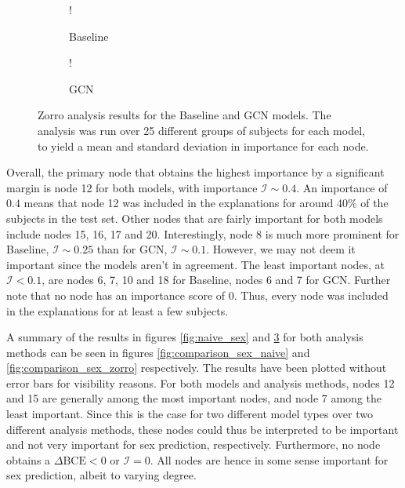 \begin{figure}[H]
    \centering
        \begin{subfigure}{.5\textwidth}
            \centering
            \begin{center}
                \resizebox {1.0\linewidth} {!} {
                    
                }
            \end{center}
            \caption{Baseline}
            \label{fig:zorro_sex_baseline}
        \end{subfigure}%
        \begin{subfigure}{.5\textwidth}
            \centering
            \begin{center}
                \resizebox {1.0\linewidth} {!} {
                    
                }
            \end{center}
            \caption{GCN}
            \label{fig:zorro_sex_gcn}
        \end{subfigure}
    \caption{Zorro analysis results for the Baseline and GCN models. The analysis was run over 25 different groups of subjects for each model, to yield a mean and standard deviation in importance for each node.}
    \label{fig:zorro_sex}
\end{figure}


Overall, the primary node that obtains the highest importance by a significant margin is node 12 for both models, with importance $\mathcal{I}\sim0.4$. An importance of $0.4$ means that node 12 was included in the explanations for around 40\% of the subjects in the test set. Other nodes that are fairly important for both models include nodes 15, 16, 17 and 20. Interestingly, node 8 is much more prominent for Baseline, $\mathcal{I}\sim0.25$ than for GCN, $\mathcal{I}\sim0.1$. However, we may not deem it important since the models aren't in agreement. The least important nodes, at $\mathcal{I}<0.1$, are nodes 6, 7, 10 and 18 for Baseline, nodes 6 and 7 for GCN. Further note that no node has an importance score of 0. Thus, every node was included in the explanations for at least a few subjects.


A summary of the results in figures \ref{fig:naive_sex} and \ref{fig:zorro_sex} for both analysis methods can be seen in figures \ref{fig:comparison_sex_naive} and \ref{fig:comparison_sex_zorro} respectively. The results have been plotted without error bars for visibility reasons. For both models and analysis methods, nodes 12 and 15 are generally among the most important nodes, and node 7 among the least important. Since this is the case for two different model types over two different analysis methods, these nodes could thus be interpreted to be important and not very important for sex prediction, respectively. Furthermore, no node obtains a $\Delta\text{BCE}<0$ or $\mathcal{I}=0$. All nodes are hence in some sense important for sex prediction, albeit to varying degree. 

